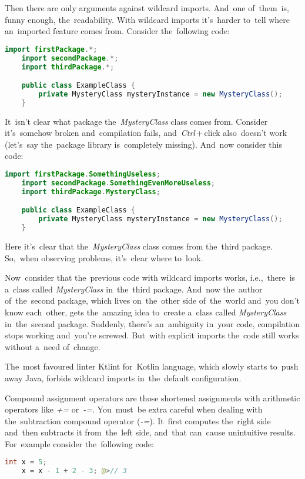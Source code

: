 Then there are only arguments against wildcard imports.
And~one of~them~is, funny enough, the~readability.
With wildcard imports it's~harder to~tell where an~imported feature comes from.
Consider the~following code:
\begin{lstlisting}[language=Java]
    import firstPackage.*;
    import secondPackage.*;
    import thirdPackage.*;

    public class ExampleClass {
        private MysteryClass mysteryInstance = new MysteryClass();
    }
\end{lstlisting}

\noindent It~isn't clear what package the~\textit{MysteryClass} class comes from.
Consider it's~somehow broken and~compilation fails, and~\textit{Ctrl}\,+\,click also~doesn't work (let's~say the~package library is~completely missing).
And~now consider this code:
\begin{lstlisting}[language=Java]
    import firstPackage.SomethingUseless;
    import secondPackage.SomethingEvenMoreUseless;
    import thirdPackage.MysteryClass;

    public class ExampleClass {
        private MysteryClass mysteryInstance = new MysteryClass();
    }
\end{lstlisting}

\noindent Here it's~clear that the~\textit{MysteryClass} class comes from the~third package.
So,~when observing problems, it's~clear where to~look.

Now~consider that the~previous code with wildcard imports works, i.e.,~there~is a~class called \textit{MysteryClass} in~the~third package.
And~now the~author of~the~second package, which lives on~the~other side of~the~world and~you don't know each~other, gets the~amazing idea to~create a~class called \textit{MysteryClass} in~the~second package.
Suddenly, there's an~ambiguity in~your code, compilation stops working and~you're screwed.
But~with explicit imports the~code still works without a~need of~change.

\note The~most favoured linter Ktlint for~Kotlin language, which slowly starts to~push away Java, forbids wildcard imports in~the~default configuration.

Compound assignment operators are those shortened assignments with arithmetic operators like \mbox{\textquotesingle\textit{+=}\textquotesingle} or~\mbox{\textquotesingle\textit{-=}\textquotesingle}.
You~must~be extra careful when dealing with the~subtraction compound operator (\mbox{\textquotesingle\textit{-=}\textquotesingle}).
It~first computes the~right side and~then subtracts it from~the~left side, and~that can~cause unintuitive results.
For~example consider the~following code:
\begin{lstlisting}[language=Java, frame=no]
    int x = 5;
    x = x - 1 + 2 - 3; @>// 3
\end{lstlisting}

